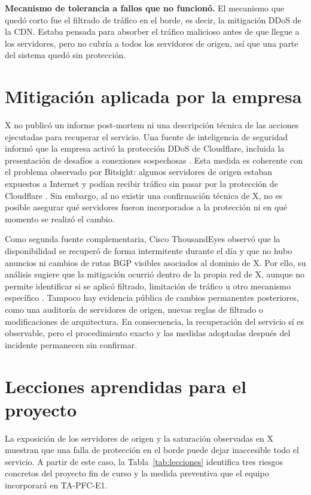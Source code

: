 \documentclass[11pt,a4paper]{article}
\begin{document}
\textbf{Mecanismo de tolerancia a fallos que no funcionó.} El mecanismo que quedó corto fue el filtrado de tráfico en el borde, es decir, la mitigación DDoS de la CDN. Estaba pensada para absorber el tráfico malicioso antes de que llegue a los servidores, pero no cubría a todos los servidores de origen, así que una parte del sistema quedó sin protección.

\section{Mitigación aplicada por la empresa}
X no publicó un informe post-mortem ni una descripción técnica de las acciones ejecutadas para recuperar el servicio. Una fuente de inteligencia de seguridad informó que la empresa activó la protección DDoS de Cloudflare, incluida la presentación de desafíos a conexiones sospechosas \cite{fieldeffect2025x}. Esta medida es coherente con el problema observado por Bitsight: algunos servidores de origen estaban expuestos a Internet y podían recibir tráfico sin pasar por la protección de Cloudflare \cite{bitsight2025ddos}. Sin embargo, al no existir una confirmación técnica de X, no es posible asegurar qué servidores fueron incorporados a la protección ni en qué momento se realizó el cambio.

Como segunda fuente complementaria, Cisco ThousandEyes observó que la disponibilidad se recuperó de forma intermitente durante el día y que no hubo anuncios ni cambios de rutas BGP visibles asociados al dominio de X. Por ello, su análisis sugiere que la mitigación ocurrió dentro de la propia red de X, aunque no permite identificar si se aplicó filtrado, limitación de tráfico u otro mecanismo específico \cite{hicks2025disruptions}. Tampoco hay evidencia pública de cambios permanentes posteriores, como una auditoría de servidores de origen, nuevas reglas de filtrado o modificaciones de arquitectura. En consecuencia, la recuperación del servicio sí es observable, pero el procedimiento exacto y las medidas adoptadas después del incidente permanecen sin confirmar.

\section{Lecciones aprendidas para el proyecto}
La exposición de los servidores de origen y la saturación observadas en X muestran que una falla de protección en el borde puede dejar inaccesible todo el servicio. A partir de este caso, la Tabla~\ref{tab:lecciones} identifica tres riesgos concretos del proyecto fin de curso y la medida preventiva que el equipo incorporará en TA-PFC-E1.
\end{document}
